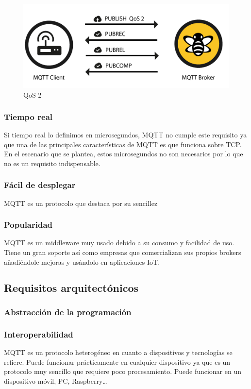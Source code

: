 \documentclass[12pt, twoside]{book}
\begin{document}
\begin{itemize}
\begin{figure}[h!]
\centering
\includegraphics[scale=0.3]{images/qos2}
\caption{QoS 2}\label{L408}
\end{figure}
\end{itemize}
\subsubsection*{Tiempo real}
Si tiempo real lo definimos en microsegundos, MQTT no cumple este requisito ya que una de las principales características de MQTT es que funciona sobre TCP. En el escenario que se plantea, estos microsegundos no son necesarios por lo que no es un requisito indispensable.

\subsubsection*{Fácil de desplegar}
MQTT es un protocolo que destaca por su sencillez
\subsubsection*{Popularidad}
MQTT es un middleware muy usado debido a su consumo y facilidad de uso. Tiene un gran soporte así como empresas que comercializan sus propios brokers añadiéndole mejoras y usándolo en aplicaciones IoT.
\subsection{Requisitos arquitectónicos}
\subsubsection*{Abstracción de la programación}

\subsubsection*{Interoperabilidad}
MQTT es un protocolo heterogéneo en cuanto a dispositivos y tecnologías se refiere. Puede funcionar prácticamente en cualquier dispositivo ya que es un protocolo muy sencillo que requiere poco procesamiento. Puede funcionar en un dispositivo móvil, PC, Raspberry…
\end{document}
